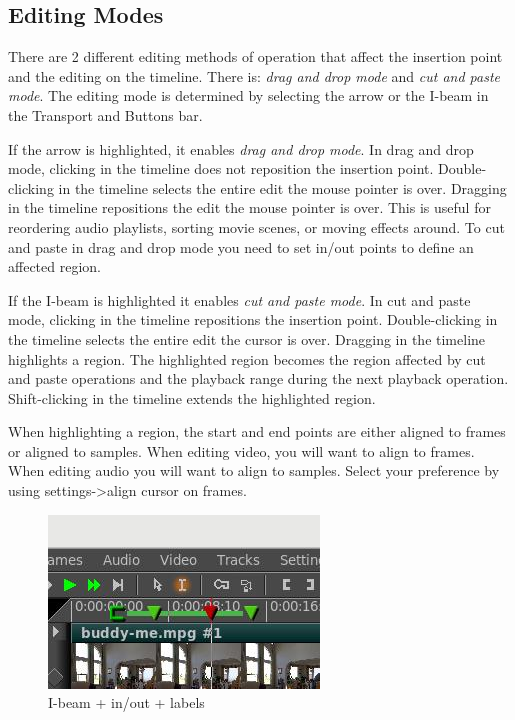 \subsection{Editing Modes}%
\label{sub:editing_modes}

There are 2 different editing methods of operation that affect the insertion point and the editing on the timeline.  
There is:  \emph{drag and drop mode} and \emph{cut and paste mode}. 
The editing mode is determined by selecting the arrow or the I-beam in the Transport and Buttons bar. 

If the arrow is highlighted, it enables \emph{drag and drop mode}.  
In drag and drop mode, clicking in the timeline does not reposition the insertion point.  
Double-clicking in the timeline selects the entire edit the mouse pointer is over.  
Dragging in the timeline repositions the edit the mouse pointer is over. 
This is useful for reordering audio playlists, sorting movie scenes, or moving effects around. 
To cut and paste in drag and drop mode you need to set in/out points to define an affected region. 

If the I-beam is highlighted it enables \emph{cut and paste mode}. 
In cut and paste mode, clicking in the timeline repositions the insertion point. 
Double-clicking in the timeline selects the entire edit the cursor is over. 
Dragging in the timeline highlights a region. 
The highlighted region becomes the region affected by cut and paste operations and the playback range during the next playback operation. 
Shift-clicking in the timeline extends the highlighted region.

When highlighting a region, the start and end points are either aligned to frames or aligned to samples. When editing video, you will want to align to frames. When editing audio you will want to align to samples. Select your preference by using settings->align cursor on frames.

\begin{figure}[htpb]
    \centering
    \includegraphics[width=0.4\linewidth]{images/i-beam.png}
    \caption{I-beam + in/out  +  labels}
    \label{fig:i-beam}
\end{figure}

